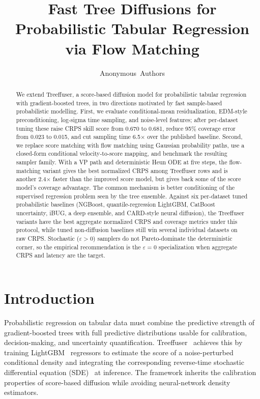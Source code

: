 \documentclass{tpm2026}
\title{Fast Tree Diffusions for Probabilistic Tabular Regression via Flow Matching}
\author[1]{Anonymous~Authors}
\affil[1]{Anonymous Institution}
\begin{document}
\maketitle

\begin{abstract}
We extend Treeffuser, a score-based diffusion model for probabilistic tabular regression with gradient-boosted trees, in two directions motivated by fast sample-based probabilistic modelling. First, we evaluate conditional-mean residualization, EDM-style preconditioning, log-sigma time sampling, and noise-level features; after per-dataset tuning these raise CRPS skill score from 0.670 to 0.681, reduce 95\% coverage error from 0.023 to 0.015, and cut sampling time 6.5$\times$ over the published baseline. Second, we replace score matching with flow matching using Gaussian probability paths, use a closed-form conditional velocity-to-score mapping, and benchmark the resulting sampler family. With a VP path and deterministic Heun ODE at five steps, the flow-matching variant gives the best normalized CRPS among Treeffuser rows and is another 2.4$\times$ faster than the improved score model, but gives back some of the score model's coverage advantage. The common mechanism is better conditioning of the supervised regression problem seen by the tree ensemble. Against six per-dataset tuned probabilistic baselines (NGBoost, quantile-regression LightGBM, CatBoost uncertainty, iBUG, a deep ensemble, and CARD-style neural diffusion), the Treeffuser variants have the best aggregate normalized CRPS and coverage metrics under this protocol, while tuned non-diffusion baselines still win several individual datasets on raw CRPS. Stochastic ($\varepsilon > 0$) samplers do not Pareto-dominate the deterministic corner, so the empirical recommendation is the $\varepsilon = 0$ specialization when aggregate CRPS and latency are the target.
\end{abstract}

\section{Introduction}\label{sec:intro}
Probabilistic regression on tabular data must combine the predictive strength of gradient-boosted trees with full predictive distributions usable for calibration, decision-making, and uncertainty quantification. Treeffuser~\citep{treeffuser} achieves this by training LightGBM~\citep{ke2017lightgbm} regressors to estimate the score of a noise-perturbed conditional density and integrating the corresponding reverse-time stochastic differential equation (SDE)~\citep{song2021score} at inference. The framework inherits the calibration properties of score-based diffusion while avoiding neural-network density estimators.
\end{document}
